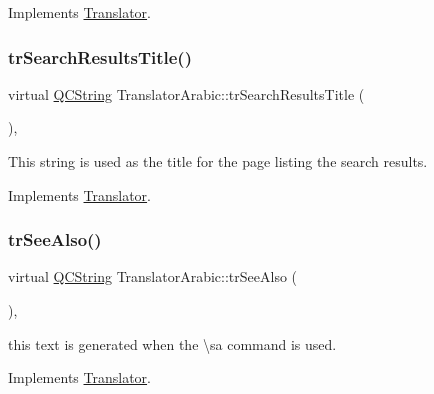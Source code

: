Implements \mbox{\hyperlink{class_translator}{Translator}}.

\mbox{\label{class_translator_arabic_a375288f06fd49370b8b1c04af4a759c5}} 
\subsubsection{\texorpdfstring{trSearchResultsTitle()}{trSearchResultsTitle()}}
{\footnotesize\ttfamily virtual \mbox{\hyperlink{class_q_c_string}{Q\+C\+String}} Translator\+Arabic\+::tr\+Search\+Results\+Title (\begin{DoxyParamCaption}{ }\end{DoxyParamCaption})\hspace{0.3cm}{\ttfamily [inline]}, {\ttfamily [virtual]}}

This string is used as the title for the page listing the search results. 

Implements \mbox{\hyperlink{class_translator}{Translator}}.

\mbox{\label{class_translator_arabic_a89ec878fbf206c84597d32e2cf3ecff2}} 
\subsubsection{\texorpdfstring{trSeeAlso()}{trSeeAlso()}}
{\footnotesize\ttfamily virtual \mbox{\hyperlink{class_q_c_string}{Q\+C\+String}} Translator\+Arabic\+::tr\+See\+Also (\begin{DoxyParamCaption}{ }\end{DoxyParamCaption})\hspace{0.3cm}{\ttfamily [inline]}, {\ttfamily [virtual]}}

this text is generated when the \textbackslash{}sa command is used. 

Implements \mbox{\hyperlink{class_translator}{Translator}}.

\mbox{\label{class_translator_arabic_ae231bc0da0b0a5c1cfba86363bcbf444}} 
